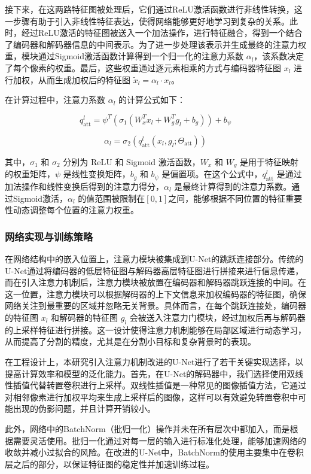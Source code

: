 接下来，在这两路特征图被处理后，它们通过ReLU激活函数进行非线性转换，这一步骤有助于引入非线性特征表达，使得网络能够更好地学习到复杂的关系。此时，经过ReLU激活的特征图被送入一个加法操作，进行特征融合，得到一个结合了编码器和解码器信息的中间表示。为了进一步处理该表示并生成最终的注意力权重，模块通过Sigmoid激活函数计算得到一个归一化的注意力系数 $\alpha_l$，该系数决定了每个像素的权重。最后，这些权重通过逐元素相乘的方式与编码器特征图 $x_l$ 进行加权，从而生成加权后的特征图 $\tilde{x}_l = \alpha_l \cdot x_l$。

在计算过程中，注意力系数 $\alpha_l$ 的计算公式如下：

\begin{equation}
    q_{\text{att}}^l = \psi^T \left( \sigma_1 (W_x^T x_l + W_g^T g_l + b_g) \right) + b_\psi
\end{equation}

\begin{equation}
    \alpha_l = \sigma_2 \left( q_{\text{att}}^l(x_l, g_l; \Theta_{\text{att}}) \right)
\end{equation}

其中，$\sigma_1$ 和 $\sigma_2$ 分别为 ReLU 和 Sigmoid 激活函数，$W_x$ 和 $W_g$ 是用于特征映射的权重矩阵，$\psi$ 是线性变换矩阵，$b_g$ 和 $b_\psi$ 是偏置项。在这个公式中，$q_{\text{att}}^l$ 是通过加法操作和线性变换后得到的注意力得分，$\alpha_l$ 是最终计算得到的注意力系数。通过Sigmoid激活，$\alpha_l$ 的值范围被限制在$[0, 1]$之间，能够根据不同位置的特征重要性动态调整每个位置的注意力权重。


\subsubsection{网络实现与训练策略}

在网络结构中的嵌入位置上，注意力模块被集成到U-Net的跳跃连接部分。传统的U-Net通过将编码器的低层特征图与解码器高层特征图进行拼接来进行信息传递，而在引入注意力机制后，注意力模块被放置在编码器和解码器跳跃连接的中间。在这一位置，注意力模块可以根据解码器的上下文信息来加权编码器的特征图，确保网络关注到最重要的区域并忽略无关背景。具体而言，在每个跳跃连接处，编码器的特征图 $x_l$ 和解码器的特征图 $g_l$ 会被送入注意力门模块，经过加权后再与解码器的上采样特征进行拼接。这一设计使得注意力机制能够在局部区域进行动态学习，从而提高了分割的精度，尤其是在分割小目标和复杂背景时的表现。

在工程设计上，本研究引入注意力机制改进的U-Net进行了若干关键实现选择，以提高计算效率和模型的泛化能力。首先，在U-Net的解码器中，我们选择使用双线性插值代替转置卷积进行上采样。双线性插值是一种常见的图像插值方法，它通过对相邻像素进行加权平均来生成上采样后的图像，这样可以有效避免转置卷积中可能出现的伪影问题，并且计算开销较小。

此外，网络中的BatchNorm（批归一化）操作并未在所有层次中都加入，而是根据需要灵活使用。批归一化通过对每一层的输入进行标准化处理，能够加速网络的收敛并减小过拟合的风险。在改进的U-Net中，BatchNorm的使用主要集中在卷积层之后的部分，以保证特征图的稳定性并加速训练过程。